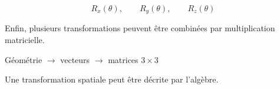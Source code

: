\documentclass[11pt,a4paper]{article}
\begin{document}
\[
\boxed{
R_x(\theta),
\qquad
R_y(\theta),
\qquad
R_z(\theta)
}
\]

Enfin, plusieurs transformations peuvent être combinées par
multiplication matricielle.

\begin{center}

\vspace{0.8cm}

{\Large\color{accent}
Géométrie $\rightarrow$ vecteurs $\rightarrow$ matrices $3\times3$\par
}

\vspace{0.4cm}

{\color{muted}
Une transformation spatiale peut être décrite par l'algèbre.\par
}

\end{center}
\end{document}

